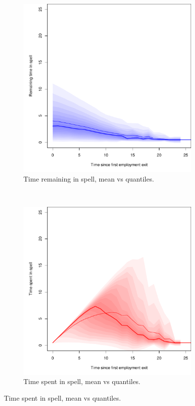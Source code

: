 \documentclass{article}
\begin{document}
\begin{figure}[ht!]
\begin{subfigure}{.49\textwidth}
\centering
\caption{Time remaining in spell, mean vs quantiles.}
\label{fig:macro3}
\includegraphics[scale=.4]{Figures/Macro3.pdf}
\end{subfigure}
~
\begin{subfigure}{.49\textwidth}
\centering
\caption{Time spent in spell, mean vs quantiles.}
\label{fig:macro4}
\includegraphics[scale=.4]{Figures/Macro4.pdf}
\end{subfigure}
\end{figure}
\end{document}
